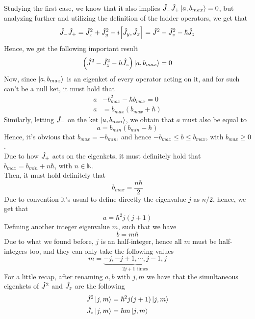 \documentclass[../qm.tex]{subfiles}
\begin{document}
	Studying the first case, we know that it also implies $\hat{J}_-\hat{J}_+\ket{a,b_{max}}=0$, but analyzing further and utilizing the definition of the ladder operators, we get that
	\begin{equation*}
		\opr{J}_-\opr{J}_+=\opr{J}_x^2+\opr{J}_y^2-i\comm{\opr{J}_y}{\opr{J}_x}=\opr{J}^2-\opr{J}_z^2-\hbar\opr{J}_z
	\end{equation*}
	Hence, we get the following important result
	\begin{equation}
		\left( \hat{J}^2-\hat{J}_z^2-\hbar\hat{J}_z \right)\ket{a,b_{max}}=0
		\label{eq:ladderladder}
	\end{equation}
	Now, since $\ket{a,b_{max}}$ is an eigenket of every operator acting on it, and for such can't be a null ket, it must hold that
	\begin{equation}
		\begin{aligned}
			a&-b^2_{max}-\hbar b_{max}=0\\
			a&=b_{max}(b_{max}+\hbar)
		\end{aligned}
		\label{eq:eigenvalueeq}
	\end{equation}
	Similarly, letting $\hat{J}_{-}$ on the ket $\ket{a,b_{min}}$, we obtain that $a$ must also be equal to
	\begin{equation*}
		a=b_{min}(b_{min}-\hbar)
	\end{equation*}
	Hence, it's obvious that $b_{max}=-b_{min}$, and hence $-b_{max}\le b\le b_{max}$, with $b_{max}\ge0$.\\
	Due to how $\hat{J}_{+}$ acts on the eigenkets, it must definitely hold that $b_{max}=b_{min}+n\hbar$, with $n\in\mathbb{N}$.\\
	Then, it must hold definitely that
	\begin{equation*}
		b_{max}=\frac{n\hbar}{2}
	\end{equation*}
	Due to convention it's usual to define directly the eigenvalue $j$ as $n/2$, hence, we get that
	\begin{equation}
		a=\hbar^2j(j+1)
		\label{eq:jsqeigenval}
	\end{equation}
	Defining another integer eigenvalue $m$, such that we have
	\begin{equation}
		b=m\hbar
		\label{eq:jzeigenvalue}
	\end{equation}
	Due to what we found before, $j$ is an half-integer, hence all $m$ must be half-integers too, and they can only take the following values
	\begin{equation}
		m=\underbrace{-j,-j+1,\cdots,j-1,j}_{2j+1\text{ times}}
		\label{eq:mdef}
	\end{equation}
	For a little recap, after renaming $a,b$ with $j,m$ we have that the simultaneous eigenkets of $\hat{J}^2$ and $\hat{J}_z$ are the following
	\begin{equation}
		\begin{aligned}
			\hat{J}^2\ket{j,m}&=\hbar^2j(j+1)\ket{j,m}\\
			\hat{J}_z\ket{j,m}&=\hbar m\ket{j,m}
		\end{aligned}
		\label{eq:eigenketsangmom}
	\end{equation}
\end{document}
